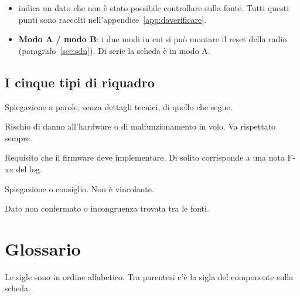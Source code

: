 \begin{itemize}
\begin{itemize}
 \item \textbf{R-xx}, \textbf{S-xx}, \textbf{P-xx}, \textbf{D1}, numeri come \enquote{1.15-01} = punti del log o delle revisioni da cui viene un'informazione. Servono solo per ritrovare la fonte: non serve conoscerli per scrivere il firmware;
 \item \textbf{I-x} e \textbf{V-x} = incongruenze e dati da verificare raccolti da questo manuale (appendice~\ref{app:daverificare}).
 \end{itemize}
\item \DV{} indica un dato che non è stato possibile controllare sulla fonte. Tutti questi punti sono raccolti nell'appendice~\ref{app:daverificare}.
\item \textbf{Modo A / modo B}: i due modi in cui si può montare il reset della radio (paragrafo~\ref{sec:sdn}). Di serie la scheda è in modo A.
\end{itemize}

\subsection*{I cinque tipi di riquadro}
\begin{semplice}[esempio]
Spiegazione a parole, senza dettagli tecnici, di quello che segue.
\end{semplice}
\begin{attenzione}[esempio]
Rischio di danno all'hardware o di malfunzionamento in volo. Va rispettato sempre.
\end{attenzione}
\begin{regola}[esempio]
Requisito che il firmware deve implementare. Di solito corrisponde a una nota F-xx del log.
\end{regola}
\begin{nota}[esempio]
Spiegazione o consiglio. Non è vincolante.
\end{nota}
\begin{verifica}[esempio]
Dato non confermato o incongruenza trovata tra le fonti.
\end{verifica}

\section{Glossario}
Le sigle sono in ordine alfabetico. Tra parentesi c'è la sigla del componente sulla scheda.

